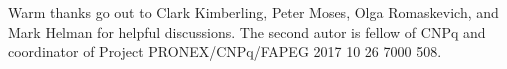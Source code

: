 Warm thanks go out to Clark Kimberling, Peter Moses, Olga Romaskevich, and Mark Helman for helpful discussions. The second autor is fellow of CNPq and coordinator of Project PRONEX/CNPq/FAPEG 2017 10 26 7000 508. 